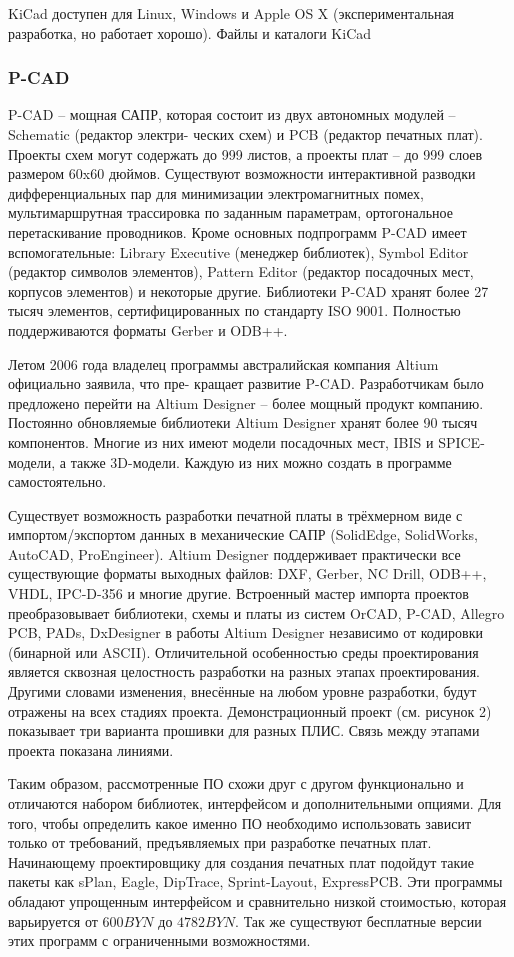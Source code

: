 KiCad доступен для Linux, Windows и Apple OS X (экспериментальная разработка, но работает хорошо).
Файлы и каталоги KiCad
\subsubsection{P-CAD}
P-CAD – мощная САПР, которая состоит из двух автономных модулей – Schematic (редактор электри-
ческих схем) и PCB (редактор печатных плат). Проекты схем могут содержать до 999 листов, а проекты плат –
до 999 слоев размером 60x60 дюймов. Существуют возможности интерактивной разводки дифференциальных
пар для минимизации электромагнитных помех, мультимаршрутная трассировка по заданным параметрам,
ортогональное перетаскивание проводников. Кроме основных подпрограмм P-CAD имеет вспомогательные:
Library Executive (менеджер библиотек), Symbol Editor (редактор символов элементов), Pattern Editor (редактор
посадочных мест, корпусов элементов) и некоторые другие. Библиотеки P-CAD хранят более 27 тысяч
элементов, сертифицированных по стандарту ISO 9001. Полностью поддерживаются форматы Gerber и
ODB++.


Летом 2006 года владелец программы австралийская компания Altium официально заявила, что пре-
кращает развитие P-CAD. Разработчикам было предложено перейти на Altium Designer – более мощный
продукт компанию. Постоянно обновляемые библиотеки Altium Designer хранят более 90 тысяч компонентов.
Многие из них имеют модели посадочных мест, IBIS и SPICE-модели, а также 3D-модели. Каждую из них можно
создать в программе самостоятельно.


Существует возможность разработки печатной платы в трёхмерном виде с импортом/экспортом данных
в механические САПР (SolidEdge, SolidWorks, AutoCAD, ProEngineer). Altium Designer поддерживает
практически все существующие форматы выходных файлов: DXF, Gerber, NC Drill, ODB++, VHDL, IPC-D-356 и
многие другие. Встроенный мастер импорта проектов преобразовывает библиотеки, схемы и платы из систем
OrCAD, P-CAD, Allegro PCB, PADs, DxDesigner в работы Altium Designer независимо от кодировки (бинарной
или ASCII). Отличительной особенностью среды проектирования является сквозная целостность разработки
на разных этапах проектирования. Другими словами изменения, внесённые на любом уровне разработки, будут
отражены на всех стадиях проекта. Демонстрационный проект (см. рисунок 2) показывает три варианта
прошивки для разных ПЛИС. Связь между этапами проекта показана линиями.

Таким образом, рассмотренные ПО схожи друг с другом функционально и отличаются набором
библиотек, интерфейсом и дополнительными опциями. Для того, чтобы определить какое именно ПО
необходимо использовать зависит только от требований, предъявляемых при разработке печатных плат.
Начинающему проектировщику для создания печатных плат подойдут такие пакеты как sPlan, Eagle, DipTrace,
Sprint-Layout, ExpressPCB. Эти программы обладают упрощенным интерфейсом и сравнительно низкой
стоимостью, которая варьируется от $600BYN$ до $4782BYN$. Так же существуют бесплатные версии этих программ с
ограниченными возможностями.


